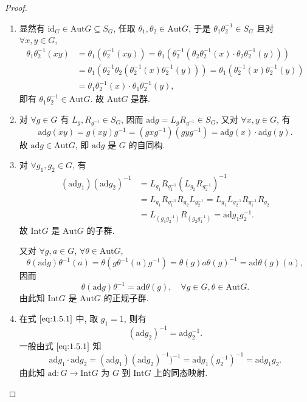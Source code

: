 \documentclass[../../main.tex]{subfiles}
\begin{document}
\begin{proof}
\begin{enumerate}[(1)]
\item 显然有 \( \text{id}_G \in \text{Aut}G \subseteq S_G \), 任取 \( \theta_1, \theta_2 \in \text{Aut}G \), 于是 \( \theta_1\theta_2^{-1} \in S_G \) 且对 \( \forall x,y \in G \),
\begin{align*}
\theta_1\theta_2^{-1}(xy) &= \theta_1(\theta_2^{-1}(xy)) = \theta_1(\theta_2^{-1}(\theta_2\theta_2^{-1}(x) \cdot \theta_2\theta_2^{-1}(y))) \\
&= \theta_1(\theta_2^{-1}\theta_2(\theta_2^{-1}(x)\theta_2^{-1}(y))) = \theta_1(\theta_2^{-1}(x)\theta_2^{-1}(y)) \\
&= \theta_1\theta_2^{-1}(x) \cdot \theta_1\theta_2^{-1}(y),
\end{align*}
即有 \( \theta_1\theta_2^{-1} \in \text{Aut}G \). 故 \( \text{Aut}G \) 是群.

\item 对 \( \forall g \in G \) 有 \( L_g, R_{g^{-1}} \in S_G \), 因而 \( \text{ad}g = L_gR_{g^{-1}} \in S_G \), 又对 \( \forall x,y \in G \), 有
\[
\text{ad}g(xy) = g(xy)g^{-1} = (gxg^{-1})(gyg^{-1}) = \text{ad}g(x) \cdot \text{ad}g(y).
\]
故 \( \text{ad}g \in \text{Aut}G \), 即 \( \text{ad}g \) 是 \( G \) 的自同构.

\item 对 \( \forall g_1,g_2 \in G \), 有
\begin{align}
(\text{ad}g_1)(\text{ad}g_2)^{-1} &= L_{g_1}R_{g_1^{-1}}(L_{g_2}R_{g_2^{-1}})^{-1} \nonumber \\
&= L_{g_1}R_{g_1^{-1}}R_{g_2}L_{g_2^{-1}} = L_{g_1}L_{g_2^{-1}}R_{g_1^{-1}}R_{g_2} \nonumber \\
&= L_{(g_1g_2^{-1})}R_{(g_2g_1^{-1})} = \text{ad}g_1g_2^{-1}. \label{eq:1.5.1}
\end{align}
故 \( \text{Int}G \) 是 \( \text{Aut}G \) 的子群.

又对 \( \forall g,a \in G \), \( \forall \theta \in \text{Aut}G \),
\[
\theta(\text{ad}g)\theta^{-1}(a) = \theta(g\theta^{-1}(a)g^{-1}) = \theta(g)a\theta(g)^{-1} = \text{ad}\theta(g)(a),
\]
因而
\[
\theta(\text{ad}g)\theta^{-1} = \text{ad}\theta(g), \quad \forall g \in G, \theta \in \text{Aut}G. \label{eq:1.5.2}
\]
由此知 \( \text{Int}G \) 是 \( \text{Aut}G \) 的正规子群.

\item 在式 \(\eqref{eq:1.5.1}\) 中, 取 \( g_1 = 1 \), 则有
\[
(\text{ad}g_2)^{-1} = \text{ad}g_2^{-1}.
\]
一般由式 \(\eqref{eq:1.5.1}\) 知
\[
\text{ad}g_1 \cdot \text{ad}g_2 = (\text{ad}g_1)(\text{ad}g_2)^{-1})^{-1} = \text{ad}g_1(g_2^{-1})^{-1} = \text{ad}g_1g_2.
\]
由此知 \( \text{ad}: G \to \text{Int}G \) 为 \( G \) 到 \( \text{Int}G \) 上的同态映射.
\end{enumerate}

\end{proof}
\end{document}
